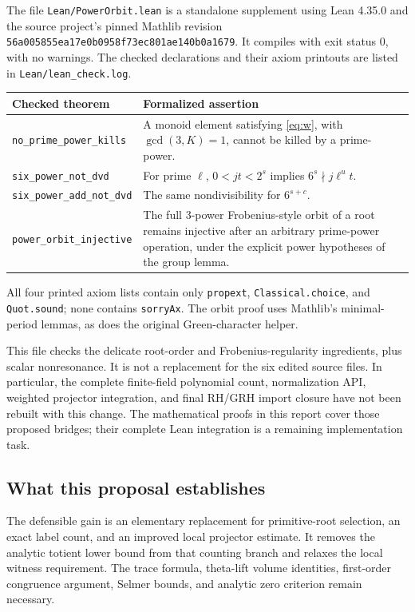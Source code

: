 \documentclass[11pt,a4paper]{article}
\theoremstyle{definition}
\theoremstyle{remark}
\newcommand{\code}[1]{{\small\nolinkurl{#1}}}
\begin{document}
The file \code{Lean/PowerOrbit.lean} is a standalone supplement using Lean
4.35.0 and the source project's pinned Mathlib revision
\code{56a005855ea17e0b0958f73ec801ae140b0a1679}.
It compiles with exit status \(0\), with no warnings.
The checked declarations and their axiom printouts are listed in
\code{Lean/lean_check.log}.

\begin{center}
\begin{tabularx}{\textwidth}{@{}lX@{}}
\toprule
Checked theorem & Formalized assertion\\
\midrule
\code{no_prime_power_kills} & A monoid element satisfying \eqref{eq:w},
with \(\gcd(3,K)=1\), cannot be killed by a prime-power.\\
\code{six_power_not_dvd} & For prime \(\ell\), \(0<jt<2^s\) implies
\(6^s\nmid j\ell^u t\).\\
\code{six_power_add_not_dvd} & The same nondivisibility for \(6^{s+c}\).\\
\code{power_orbit_injective} & The full \(3\)-power Frobenius-style orbit
of a root remains injective after an arbitrary prime-power operation,
under the explicit power hypotheses of the group lemma.\\
\bottomrule
\end{tabularx}
\end{center}

All four printed axiom lists contain only
\code{propext}, \code{Classical.choice}, and \code{Quot.sound};
none contains \code{sorryAx}.
The orbit proof uses Mathlib's minimal-period lemmas, as does the original
Green-character helper.

This file checks the delicate root-order and Frobenius-regularity ingredients,
plus scalar nonresonance. It is not a replacement for the six edited source
files. In particular, the complete finite-field polynomial count,
normalization API, weighted projector integration, and final RH/GRH import
closure have not been rebuilt with this change. The mathematical proofs in
this report cover those proposed bridges; their complete Lean integration
is a remaining implementation task.

\subsection{What this proposal establishes}

The defensible gain is an elementary replacement for primitive-root selection,
an exact label count, and an improved local projector estimate. It removes the
analytic totient lower bound from that counting branch and relaxes the local
witness requirement. The trace formula, theta-lift volume identities,
first-order congruence argument, Selmer bounds, and analytic zero criterion
remain necessary.
\end{document}
